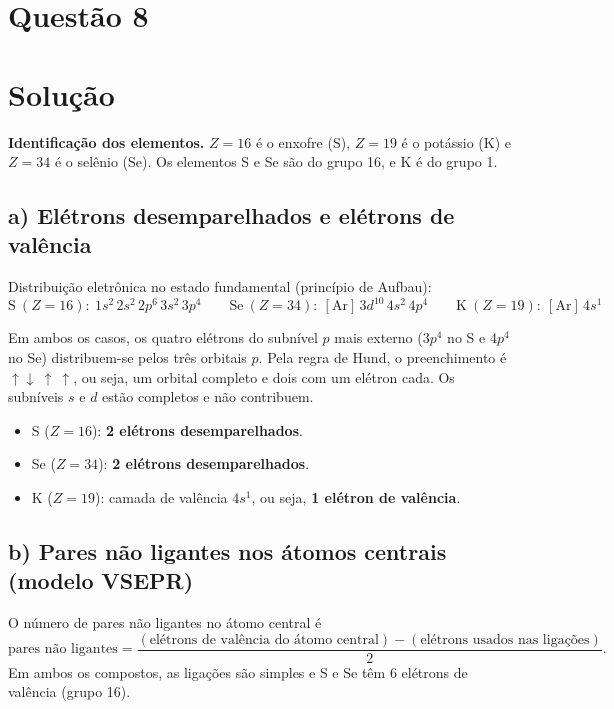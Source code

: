 \documentclass{article}%
\begin{document}
\section*{Questão 8}

\section*{Solução}

\textbf{Identificação dos elementos.} $Z=16$ é o enxofre (S), $Z=19$ é o potássio (K) e $Z=34$ é o selênio (Se). Os elementos S e Se são do grupo 16, e K é do grupo 1.

\subsection*{a) Elétrons desemparelhados e elétrons de valência}

Distribuição eletrônica no estado fundamental (princípio de Aufbau):
\[
\mathrm{S}\ (Z=16):\ 1s^2\,2s^2\,2p^6\,3s^2\,3p^4
\qquad
\mathrm{Se}\ (Z=34):\ [\mathrm{Ar}]\,3d^{10}\,4s^2\,4p^4
\qquad
\mathrm{K}\ (Z=19):\ [\mathrm{Ar}]\,4s^1
\]

Em ambos os casos, os quatro elétrons do subnível $p$ mais externo ($3p^4$ no S e $4p^4$ no Se) distribuem-se pelos três orbitais $p$. Pela regra de Hund, o preenchimento é $\uparrow\downarrow\ \uparrow\ \uparrow$, ou seja, um orbital completo e dois com um elétron cada. Os subníveis $s$ e $d$ estão completos e não contribuem.

\begin{itemize}
\item S ($Z=16$): \textbf{2 elétrons desemparelhados}.
\item Se ($Z=34$): \textbf{2 elétrons desemparelhados}.
\item K ($Z=19$): camada de valência $4s^1$, ou seja, \textbf{1 elétron de valência}.
\end{itemize}

\subsection*{b) Pares não ligantes nos átomos centrais (modelo VSEPR)}

O número de pares não ligantes no átomo central é
\[
\text{pares não ligantes}=\frac{(\text{elétrons de valência do átomo central})-(\text{elétrons usados nas ligações})}{2}.
\]
Em ambos os compostos, as ligações são simples e S e Se têm 6 elétrons de valência (grupo 16).
\end{document}
